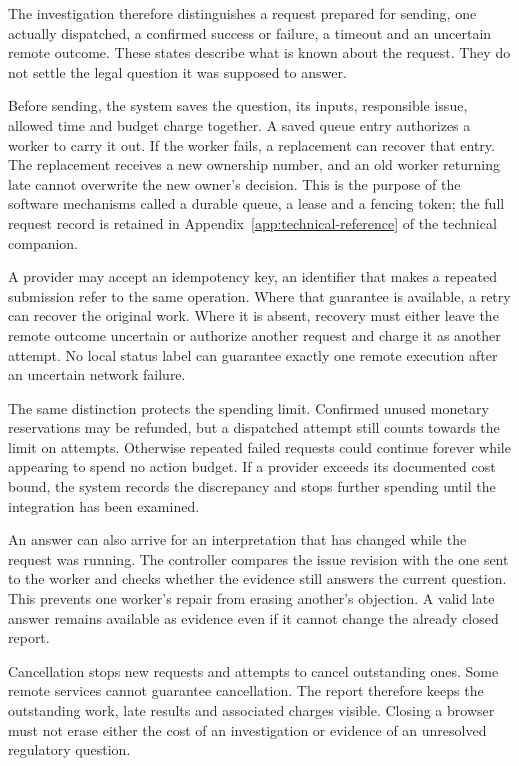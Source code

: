 The investigation therefore distinguishes a request prepared for sending, one
actually dispatched, a confirmed success or failure, a timeout and an uncertain
remote outcome. These states describe what is known about the request. They do
not settle the legal question it was supposed to answer.

Before sending, the system saves the question, its inputs, responsible issue,
allowed time and budget charge together. A saved queue entry authorizes a worker
to carry it out. If the worker fails, a replacement can recover that entry. The
replacement receives a new ownership number, and an old worker returning late
cannot overwrite the new owner's decision. This is the purpose of the software
mechanisms called a durable queue, a lease and a fencing token; the full request
record is retained in Appendix~\ref{app:technical-reference} of the technical companion.

A provider may accept an idempotency key, an identifier that makes a repeated
submission refer to the same operation. Where that guarantee is available, a
retry can recover the original work. Where it is absent, recovery must either
leave the remote outcome uncertain or authorize another request and charge it
as another attempt. No local status label can guarantee exactly one remote
execution after an uncertain network failure.


The same distinction protects the spending limit. Confirmed unused monetary
reservations may be refunded, but a dispatched attempt still counts towards the
limit on attempts. Otherwise repeated failed requests could continue forever
while appearing to spend no action budget. If a provider exceeds its documented
cost bound, the system records the discrepancy and stops further spending until
the integration has been examined.

An answer can also arrive for an interpretation that has changed while the
request was running. The controller compares the issue revision with the one
sent to the worker and checks whether the evidence still answers the current
question. This prevents one worker's repair from erasing another's objection.
A valid late answer remains available as evidence even if it cannot change the
already closed report.

Cancellation stops new requests and attempts to cancel outstanding ones. Some
remote services cannot guarantee cancellation. The report therefore keeps the
outstanding work, late results and associated charges visible. Closing a browser
must not erase either the cost of an investigation or evidence of an unresolved
regulatory question.

